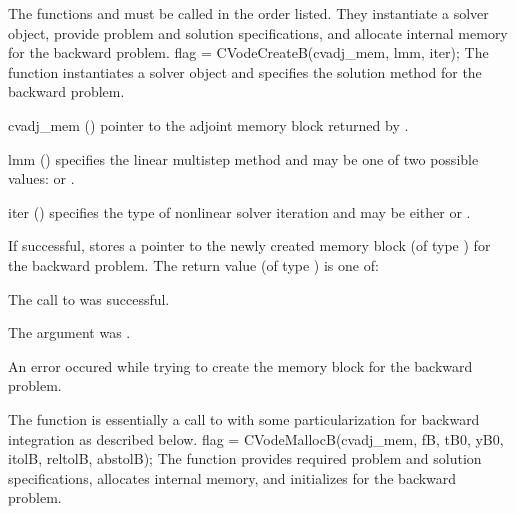The functions  and  must be called in the order listed. 
They instantiate a {\cvodes} solver object, provide problem and solution specifications, 
and allocate internal memory for the backward problem.
{
  flag = CVodeCreateB(cvadj\_mem, lmm, iter);
}
{
  The function  instantiates a {\cvodes} solver object and specifies 
  the solution method for the backward problem.
}
{
  \begin{args}
  \item[cvadj\_mem] ()
    pointer to the adjoint memory block returned by .
  \item[lmm] ()
    specifies the linear multistep method and may be one of two
    possible values:  or .     
  \item[iter] ()
    specifies the type of nonlinear solver iteration and may be
    either  or . 
  \end{args}
}
{
  If successful,  stores a pointer to the newly created 
  {\cvodes} memory block (of type ) for the backward problem.
   The return value  (of type ) is one of:
  \begin{args}
  \item[\Id{CV\_SUCCESS}]
    The call to  was successful.
  \item[\Id{CV\_ADJMEM\_NULL}]
    The  argument was .
  \item[\Id{CV\_MEM\_FAIL}]
    An error occured while trying to create the {\cvodes} memory block for the backward 
    problem.
  \end{args}
}
{}
The function  is essentially a call to  with some 
particularization for backward integration as described below.
{
  flag = CVodeMallocB(cvadj\_mem, fB, tB0, yB0, itolB, reltolB, abstolB);
}
{
  The function  provides required problem and solution specifications, 
  allocates internal memory, and initializes {\cvodes} for the backward problem.
}
